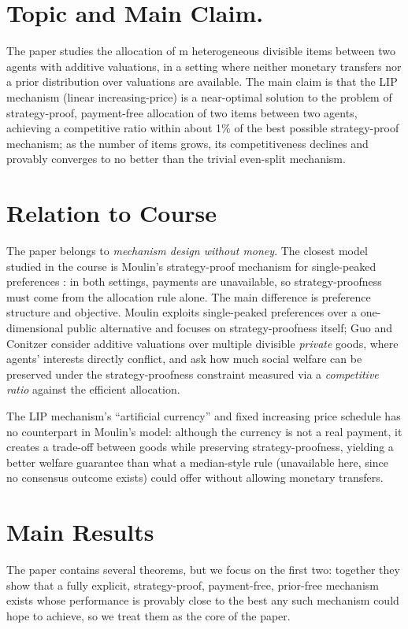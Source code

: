 \section{Topic and Main Claim.}

The paper studies the allocation of m heterogeneous divisible items between two agents with additive valuations, in a setting where neither monetary transfers nor a prior distribution over valuations are available. The main claim is that the LIP mechanism (linear increasing-price) is a near-optimal solution to the problem of strategy-proof, payment-free allocation of two items between two agents, achieving a competitive ratio within about 1\% of the best possible strategy-proof mechanism; as the number of items grows, its competitiveness declines and provably converges to no better than the trivial even-split mechanism.

\section{Relation to Course}
The paper belongs to \emph{mechanism design without money}. The closest model
studied in the course is Moulin's strategy-proof mechanism for single-peaked
preferences \cite{moulin}: in both settings, payments are unavailable, so
strategy-proofness must come from the allocation rule alone. The main
difference is preference structure and objective. Moulin exploits
single-peaked preferences over a one-dimensional public alternative and
focuses on strategy-proofness itself; Guo and Conitzer consider additive
valuations over multiple divisible \emph{private} goods, where agents'
interests directly conflict, and ask how much social welfare can be
preserved under the strategy-proofness constraint measured via a
\emph{competitive ratio} against the efficient allocation.

The LIP mechanism's ``artificial currency'' and fixed increasing price
schedule has no counterpart in Moulin's model: although the currency is not
a real payment, it creates a trade-off between goods while preserving
strategy-proofness, yielding a better welfare guarantee than what a
median-style rule (unavailable here, since no consensus outcome exists) could
offer without allowing monetary transfers.

\section{Main Results}

The paper contains several theorems, but we focus on the first two: together
they show that a fully explicit, strategy-proof, payment-free, prior-free
mechanism exists whose performance is provably close to the best any such
mechanism could hope to achieve, so we treat them as the core of the paper.

